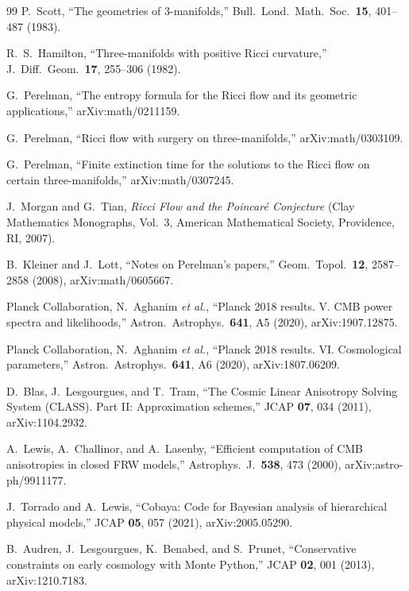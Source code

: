 \documentclass[
  reprint,
  amsmath,amssymb,
  aps,
  prd,
  superscriptaddress,
  nofootinbib,
  longbibliography
]{revtex4-2}
\theoremstyle{definition}
\theoremstyle{remark}
\begin{document}
\begin{thebibliography}{99}
P.~Scott,
``The geometries of 3-manifolds,''
Bull.\ Lond.\ Math.\ Soc.\ \textbf{15}, 401--487 (1983).


R.~S.~Hamilton,
``Three-manifolds with positive Ricci curvature,''
J.\ Diff.\ Geom.\ \textbf{17}, 255--306 (1982).

G.~Perelman,
``The entropy formula for the Ricci flow and its geometric applications,''
arXiv:math/0211159.

G.~Perelman,
``Ricci flow with surgery on three-manifolds,''
arXiv:math/0303109.

G.~Perelman,
``Finite extinction time for the solutions to the Ricci flow on certain three-manifolds,''
arXiv:math/0307245.

J.~Morgan and G.~Tian,
\emph{Ricci Flow and the Poincar\'e Conjecture}
(Clay Mathematics Monographs, Vol.~3, American Mathematical Society, Providence, RI, 2007).

B.~Kleiner and J.~Lott,
``Notes on Perelman{'}s papers,''
Geom.\ Topol.\ \textbf{12}, 2587--2858 (2008),
arXiv:math/0605667.

Planck Collaboration,
N.~Aghanim \textit{et al.},
``Planck 2018 results. V. CMB power spectra and likelihoods,''
Astron.\ Astrophys.\ \textbf{641}, A5 (2020),
arXiv:1907.12875.

Planck Collaboration,
N.~Aghanim \textit{et al.},
``Planck 2018 results. VI. Cosmological parameters,''
Astron.\ Astrophys.\ \textbf{641}, A6 (2020),
arXiv:1807.06209.

D.~Blas, J.~Lesgourgues, and T.~Tram,
``The Cosmic Linear Anisotropy Solving System (CLASS). Part II: Approximation schemes,''
JCAP \textbf{07}, 034 (2011),
arXiv:1104.2932.

A.~Lewis, A.~Challinor, and A.~Lasenby,
``Efficient computation of CMB anisotropies in closed FRW models,''
Astrophys.\ J.\ \textbf{538}, 473 (2000),
arXiv:astro-ph/9911177.

J.~Torrado and A.~Lewis,
``Cobaya: Code for Bayesian analysis of hierarchical physical models,''
JCAP \textbf{05}, 057 (2021),
arXiv:2005.05290.

B.~Audren, J.~Lesgourgues, K.~Benabed, and S.~Prunet,
``Conservative constraints on early cosmology with Monte Python,''
JCAP \textbf{02}, 001 (2013),
arXiv:1210.7183.


\end{thebibliography}
\end{document}
